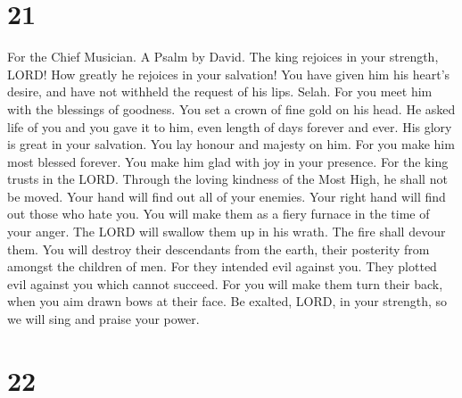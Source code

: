 \hypertarget{section-20}{%
\section{21}\label{section-20}}

For the Chief Musician. A Psalm by David.  The king
rejoices in your strength, LORD! How greatly he rejoices in your
salvation!  You have given him his heart's desire, and
have not withheld the request of his lips. Selah.  For you
meet him with the blessings of goodness. You set a crown of fine gold on
his head.  He asked life of you and you gave it to him,
even length of days forever and ever.  His glory is great
in your salvation. You lay honour and majesty on him.  For
you make him most blessed forever. You make him glad with joy in your
presence.  For the king trusts in the LORD. Through the
loving kindness of the Most High, he shall not be moved. 
Your hand will find out all of your enemies. Your right hand will find
out those who hate you.  You will make them as a fiery
furnace in the time of your anger. The LORD will swallow them up in his
wrath. The fire shall devour them.  You will destroy
their descendants from the earth, their posterity from amongst the
children of men.  For they intended evil against you.
They plotted evil against you which cannot succeed.  For
you will make them turn their back, when you aim drawn bows at their
face.  Be exalted, LORD, in your strength, so we will
sing and praise your power.

\hypertarget{section-21}{%
\section{22}\label{section-21}}

